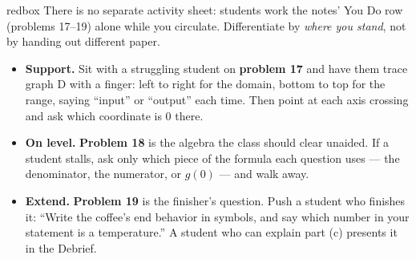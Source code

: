 \documentclass[10pt]{article}
\begin{document}
\begin{skillbox}{redbox}
There is no separate activity sheet: students work the notes' You Do row (problems 17--19)
alone while you circulate. Differentiate by \textit{where you stand}, not by handing out
different paper.

\begin{itemize}
  \item \textbf{Support.} Sit with a struggling student on \textbf{problem 17} and have them
        trace graph D with a finger: left to right for the domain, bottom to top for the range,
        saying ``input'' or ``output'' each time. Then point at each axis crossing and ask which
        coordinate is 0 there.
  \item \textbf{On level.} \textbf{Problem 18} is the algebra the class should clear unaided.
        If a student stalls, ask only which piece of the formula each question uses --- the
        denominator, the numerator, or $g(0)$ --- and walk away.
  \item \textbf{Extend.} \textbf{Problem 19} is the finisher's question. Push a student who
        finishes it: ``Write the coffee's end behavior in symbols, and say which number in your
        statement is a temperature.'' A student who can explain part (c) presents it in the
        Debrief.
\end{itemize}
\end{skillbox}
\end{document}
